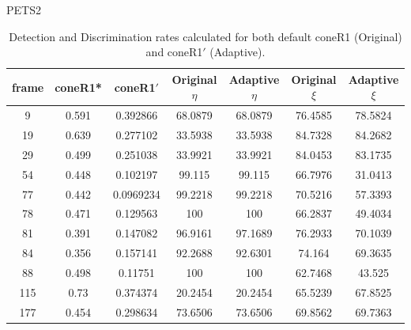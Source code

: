 \begin{appendices}
\begin{table}
\end{table}
\begin{table}
\centering
\caption{PETS2}
\caption*{Detection and Discrimination rates calculated for both default coneR1 (Original) and coneR1$'$ (Adaptive).}
\begin{tabular}{ |c|c|c|c|c|c|c| }
\hline
\textbf{frame} &  \textbf{coneR1*} &  \textbf{coneR1$'$} &  \textbf{Original $\eta$} &  \textbf{Adaptive $\eta$} &  \textbf{Original $\xi$} &  \textbf{Adaptive $\xi$} \\
\hline
\hline
9 &  0.591 &  0.392866 &  68.0879 &  68.0879 &  76.4585 &  78.5824 \\
\hline
19 &  0.639 &  0.277102 &  33.5938 &  33.5938 &  84.7328 &  84.2682 \\
\hline
29 &  0.499 &  0.251038 &  33.9921 &  33.9921 &  84.0453 &  83.1735 \\
\hline
54 &  0.448 &  0.102197 &  99.115 &  99.115 &  66.7976 &  31.0413 \\
\hline
77 &  0.442 &  0.0969234 &  99.2218 &  99.2218 &  70.5216 &  57.3393 \\
\hline
78 &  0.471 &  0.129563 &  100 &  100 &  66.2837 &  49.4034 \\
\hline
81 &  0.391 &  0.147082 &  96.9161 &  97.1689 &  76.2933 &  70.1039 \\
\hline
84 &  0.356 &  0.157141 &  92.2688 &  92.6301 &  74.164 &  69.3635 \\
\hline
88 &  0.498 &  0.11751 &  100 &  100 &  62.7468 &  43.525 \\
\hline
115 &  0.73 &  0.374374 &  20.2454 &  20.2454 &  65.5239 &  67.8525 \\
\hline
177 &  0.454 &  0.298634 &  73.6506 &  73.6506 &  69.8562 &  69.7363 \\

\hline
\end{tabular}

\end{table}


\end{appendices}
